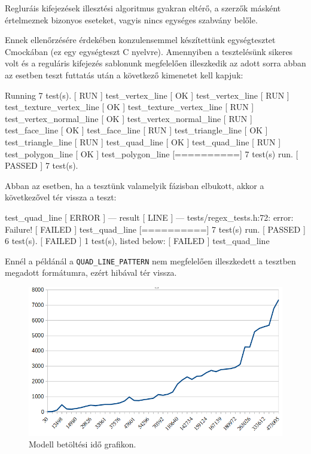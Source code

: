 

Regluráis kifejezések illesztési algoritmus gyakran eltérő, a szerzők másként értelmeznek bizonyos eseteket, vagyis nincs egységes szabvány belőle.

Ennek ellenőrzésére érdekében konzulensemmel készítettünk egységtesztet Cmockában (ez egy egységteszt C nyelvre). Amennyiben a tesztelésünk sikeres volt és a reguláris kifejezés sablonunk megfelelően illeszkedik az adott sorra abban az esetben teszt futtatás után a következő kimenetet kell kapjuk:
\bigskip
\begin{python}
[==========] Running 7 test(s).
[ RUN      ] test_vertex_line
[       OK ] test_vertex_line
[ RUN      ] test_texture_vertex_line
[       OK ] test_texture_vertex_line
[ RUN      ] test_vertex_normal_line
[       OK ] test_vertex_normal_line
[ RUN      ] test_face_line
[       OK ] test_face_line
[ RUN      ] test_triangle_line
[       OK ] test_triangle_line
[ RUN      ] test_quad_line
[       OK ] test_quad_line
[ RUN      ] test_polygon_line
[       OK ] test_polygon_line
[==========] 7 test(s) run.
[  PASSED  ] 7 test(s).
\end{python}
\newpage

\noindent Abban az esetben, ha a tesztünk valamelyik fázisban elbukott, akkor a következővel tér vissza a teszt:
\bigskip

\begin{python}
[ RUN      ] test_quad_line
[  ERROR   ] --- result
[   LINE   ] --- tests/regex_tests.h:72: error: Failure!
[  FAILED  ] test_quad_line
[==========] 7 test(s) run.
[  PASSED  ] 6 test(s).
[  FAILED  ] 1 test(s), listed below:
[  FAILED  ] test_quad_line
\end{python}
\bigskip

Ennél a példánál a \texttt{QUAD\_LINE\_PATTERN} nem megfelelően illeszkedett  a tesztben megadott formátumra, ezért hibával tér vissza.

\begin{figure}[h]
\centering
\includegraphics[width=\textwidth]{images/betoltesiido.png}
\caption{Modell betöltési idő grafikon.}
\label{fig:betolt}
\end{figure}

